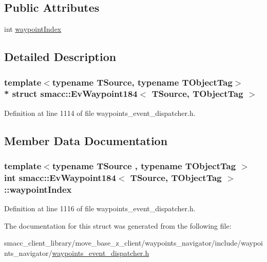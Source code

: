 \subsection*{Public Attributes}
\begin{DoxyCompactItemize}
\item 
int \hyperlink{structsmacc_1_1EvWaypoint184_a805f36cabbdf8c4dffd8f41d281f853a}{waypoint\+Index}
\end{DoxyCompactItemize}


\subsection{Detailed Description}
\subsubsection*{template$<$typename T\+Source, typename T\+Object\+Tag$>$\\*
struct smacc\+::\+Ev\+Waypoint184$<$ T\+Source, T\+Object\+Tag $>$}



Definition at line 1114 of file waypoints\+\_\+event\+\_\+dispatcher.\+h.



\subsection{Member Data Documentation}
\subsubsection[{\texorpdfstring{waypoint\+Index}{waypointIndex}}]{\setlength{\rightskip}{0pt plus 5cm}template$<$typename T\+Source , typename T\+Object\+Tag $>$ int {\bf smacc\+::\+Ev\+Waypoint184}$<$ T\+Source, T\+Object\+Tag $>$\+::waypoint\+Index}\hypertarget{structsmacc_1_1EvWaypoint184_a805f36cabbdf8c4dffd8f41d281f853a}{}\label{structsmacc_1_1EvWaypoint184_a805f36cabbdf8c4dffd8f41d281f853a}


Definition at line 1116 of file waypoints\+\_\+event\+\_\+dispatcher.\+h.



The documentation for this struct was generated from the following file\+:\begin{DoxyCompactItemize}
\item 
smacc\+\_\+client\+\_\+library/move\+\_\+base\+\_\+z\+\_\+client/waypoints\+\_\+navigator/include/waypoints\+\_\+navigator/\hyperlink{waypoints__event__dispatcher_8h}{waypoints\+\_\+event\+\_\+dispatcher.\+h}\end{DoxyCompactItemize}
